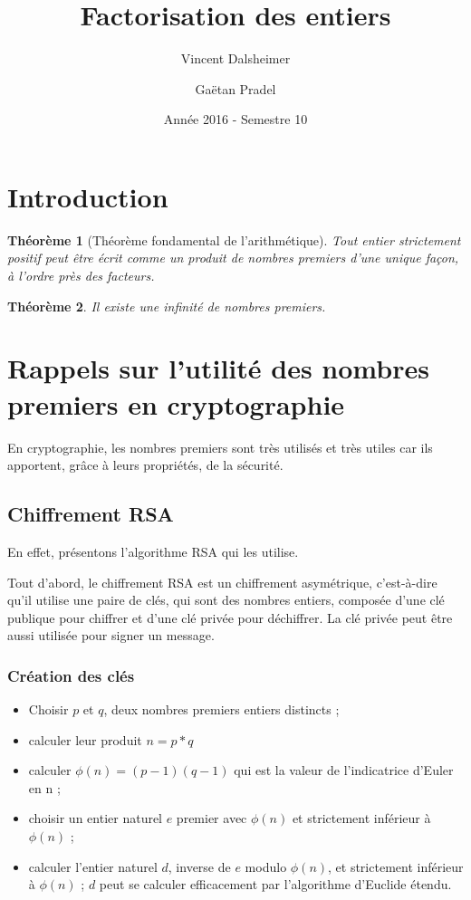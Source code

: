 \documentclass[french, 12pt, titlepage]{article}
\newenvironment{itemH}[0]{\begin{itemize}[label=$\bullet$, font=\color{black} \large]}{\end{itemize}}
\newtheorem{theoreme}{Th{\'e}or{\`e}me}
\begin{document}
\title{Factorisation des entiers}
\author{Vincent Dalsheimer \and
	Gaëtan Pradel}
\date{Année 2016 - Semestre 10}
\maketitle
\tableofcontents

\newpage
\section{Introduction}

\begin{theoreme}[Théorème fondamental de l'arithmétique]
  Tout entier strictement positif peut être écrit comme un produit de nombres premiers d'une unique façon, à l'ordre près des facteurs.
\end{theoreme}


\begin{theoreme}
  Il existe une infinité de nombres premiers.
\end{theoreme}


\section{Rappels sur l'utilité des nombres premiers en cryptographie}
En cryptographie, les nombres premiers sont très utilisés et très utiles car ils apportent, grâce à leurs propriétés, de la sécurité.

\subsection{Chiffrement RSA}
En effet, présentons l'algorithme RSA qui les utilise.

Tout d'abord, le chiffrement RSA est un chiffrement asymétrique, c'est-à-dire qu'il utilise une paire de clés, qui sont des nombres entiers, composée d'une clé publique pour chiffrer et d'une clé privée pour déchiffrer.
La clé privée peut être aussi utilisée pour signer un message.

\subsubsection{Création des clés}

\begin{itemH}
\item Choisir $p$ et $q$, deux nombres premiers entiers distincts ;
\item calculer leur produit $n = p*q$
\item calculer $\phi (n) = (p - 1)(q - 1)$ qui est la valeur de l'indicatrice d'Euler en n ;
\item choisir un entier naturel $e$ premier avec $\phi (n)$ et strictement inférieur à $\phi (n)$ ;
\item calculer l'entier naturel $d$, inverse de $e$ modulo $ \phi (n)$, et strictement inférieur à $\phi (n)$ ; $d$ peut se calculer efficacement par l'algorithme d'Euclide étendu.
\end{itemH}
\end{document}
